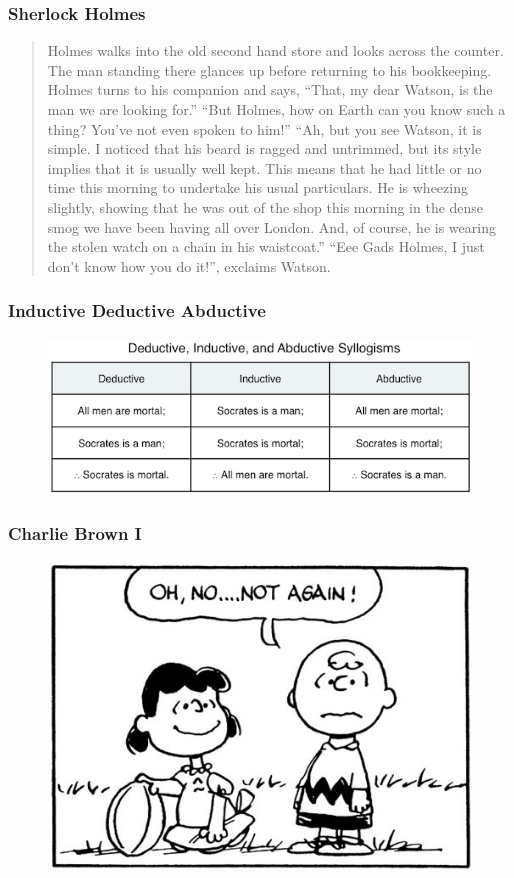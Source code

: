 \documentclass[xcolor=dvipsnames]{beamer}
\begin{document}
\begin{frame}
  \frametitle{Sherlock Holmes}
  \begin{quote}
    Holmes walks into the old second hand store and looks across the
    counter. The man standing there glances up before returning to his
    bookkeeping. Holmes turns to his companion and says, ``That, my
    dear Watson, is the man we are looking for.'' ``But Holmes, how on
    Earth can you know such a thing? You've not even spoken to him!''
    ``Ah, but you see Watson, it is simple. I noticed that his beard is
    ragged and untrimmed, but its style implies that it is usually
    well kept. This means that he had little or no time this morning
    to undertake his usual particulars. He is wheezing slightly,
    showing that he was out of the shop this morning in the dense smog
    we have been having all over London. And, of course, he is wearing
    the stolen watch on a chain in his waistcoat.'' ``Eee Gads Holmes, I
    just don't know how you do it!'', exclaims Watson.
  \end{quote}
\end{frame}

\begin{frame}
  \frametitle{Inductive Deductive Abductive}
  \begin{figure}[h]
    \includegraphics[scale=0.55]{./inabde.png}
  \end{figure}
\end{frame}

\begin{frame}
  \frametitle{Charlie Brown I}
  \begin{figure}[h]
    \includegraphics[scale=0.5]{./charliebrown1.jpg}
  \end{figure}
\end{frame}
\end{document}
